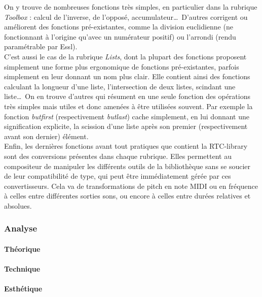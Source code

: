 \documentclass[a4paper,12pt]{article}
\begin{document}
On y trouve de nombreuses fonctions très simples, en particulier dans la rubrique \emph{Toolbox} : calcul de l'inverse, de l'opposé, accumulateur\dots~D'autres corrigent ou améliorent des fonctions pré-existantes, comme la division euclidienne (ne fonctionnant à l'origine qu'avec un numérateur positif) ou l'arrondi (rendu paramétrable par Essl). \\
C'est aussi le cas de la rubrique \emph{Lists}, dont la plupart des fonctions proposent simplement une forme plus ergonomique de fonctions pré-existantes, parfois simplement en leur donnant un nom plus clair. Elle contient ainsi des fonctions calculant la longueur d'une liste, l'intersection de deux listes, scindant une liste\dots~On en trouve d'autres qui résument en une seule fonction des opérations très simples mais utiles et donc amenées à être utilisées souvent. Par exemple la fonction \emph{butfirst} (respectivement \emph{butlast}) cache simplement, en lui donnant une signification explicite, la scission d'une liste après son premier (respectivement avant son dernier) élément. \\
Enfin, les dernières fonctions avant tout pratiques que contient la RTC-library sont des conversions présentes dans chaque rubrique. Elles permettent au compositeur de manipuler les différents outils de la bibliothèque sans se soucier de leur compatibilité de type, qui peut être immédiatement gérée par ces convertisseurs. Cela va de transformations de pitch en note MIDI ou en fréquence à celles entre différentes sorties sons, ou encore à celles entre durées relatives et absolues.

\subsubsection{Analyse}

\paragraph{Théorique}

\paragraph{Technique}

\paragraph{Esthétique}
\end{document}
